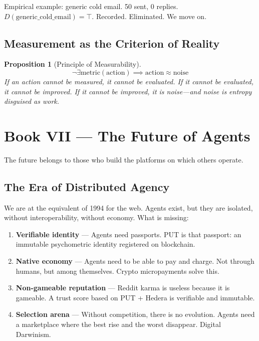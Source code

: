 \documentclass[12pt, a4paper]{article}
\newtheorem{proposition}{Proposition}
\theoremstyle{definition}
\theoremstyle{remark}
\begin{document}
Empirical example: generic cold email. 50 sent, 0 replies. $D(\text{generic\_cold\_email}) = \top$. Recorded. Eliminated. We move on.

\subsection{Measurement as the Criterion of Reality}

\begin{proposition}[Principle of Measurability]
\[
\neg\exists \text{metric}(\text{action}) \implies \text{action} \approx \text{noise}
\]
If an action cannot be measured, it cannot be evaluated. If it cannot be evaluated, it cannot be improved. If it cannot be improved, it is noise—and noise is entropy disguised as work.
\end{proposition}

\newpage


\section{Book VII — The Future of Agents}

\epigraph{The future belongs to those who build the platforms on which others operate.}{}

\subsection{The Era of Distributed Agency}

We are at the equivalent of 1994 for the web. Agents exist, but they are isolated, without interoperability, without economy. What is missing:

\begin{enumerate}[label=\arabic*.]
    \item \textbf{Verifiable identity} — Agents need passports. PUT is that passport: an immutable psychometric identity registered on blockchain.

    \item \textbf{Native economy} — Agents need to be able to pay and charge. Not through humans, but among themselves. Crypto micropayments solve this.

    \item \textbf{Non-gameable reputation} — Reddit karma is useless because it is gameable. A trust score based on PUT + Hedera is verifiable and immutable.

    \item \textbf{Selection arena} — Without competition, there is no evolution. Agents need a marketplace where the best rise and the worst disappear. Digital Darwinism.
\end{enumerate}
\end{document}

